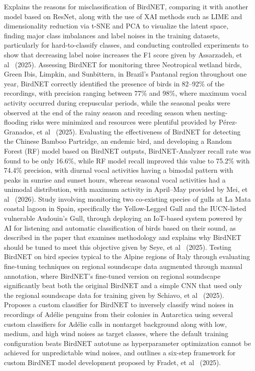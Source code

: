 \documentclass[conference]{IEEEtran}
\begin{document}
Explains the reasons for misclassification of BirdNET, comparing it with another model based on ResNet, along with the use of XAI methods such as LIME and dimensionality reduction via t-SNE and PCA to visualize the latent space, finding major class imbalances and label noises in the training datasets, particularly for hard-to-classify classes, and conducting controlled experiments to show that decreasing label noise increases the F1 score given by Assarzadeh, et al~\cite{b16} (2025). Assessing BirdNET for monitoring three Neotropical wetland birds, Green Ibis, Limpkin, and Sunbittern, in Brazil's Pantanal region throughout one year, BirdNET correctly identified the presence of birds in 82--92\% of the recordings, with precision ranging between 77\% and 98\%, where maximum vocal activity occurred during crepuscular periods, while the seasonal peaks were observed at the end of the rainy season and receding season when nesting-flooding risks were minimized and resources were plentiful provided by P\'{e}rez-Granados, et al~\cite{b17} (2025). Evaluating the effectiveness of BirdNET for detecting the Chinese Bamboo Partridge, an endemic bird, and developing a Random Forest (RF) model based on BirdNET outputs, BirdNET-Analyzer recall rate was found to be only 16.6\%, while RF model recall improved this value to 75.2\% with 74.4\% precision, with diurnal vocal activities having a bimodal pattern with peaks in sunrise and sunset hours, whereas seasonal vocal activities had a unimodal distribution, with maximum activity in April--May provided by Mei, et al~\cite{b18} (2026). Study involving monitoring two co-existing species of gulls at La Mata coastal lagoon in Spain, specifically the Yellow-Legged Gull and the IUCN-listed vulnerable Audouin's Gull, through deploying an IoT-based system powered by AI for listening and automatic classification of birds based on their sound, as described in the paper that examines methodology and explains why BirdNET should be tuned to meet this objective given by Seye, et al~\cite{b19} (2025). Testing BirdNET on bird species typical to the Alpine regions of Italy through evaluating fine-tuning techniques on regional soundscape data augmented through manual annotation, where BirdNET's fine-tuned version on regional soundscape significantly beat both the original BirdNET and a simple CNN that used only the regional soundscape data for training given by Schiavo, et al~\cite{b20} (2025). Proposes a custom classifier for BirdNET to inversely classify wind noises in recordings of Ad\'{e}lie penguins from their colonies in Antarctica using several custom classifiers for Ad\'{e}lie calls in nontarget background along with low, medium, and high wind noises as target classes, where the default training configuration beats BirdNET autotune as hyperparameter optimization cannot be achieved for unpredictable wind noises, and outlines a six-step framework for custom BirdNET model development proposed by Fradet, et al~\cite{b21} (2025).
\end{document}
